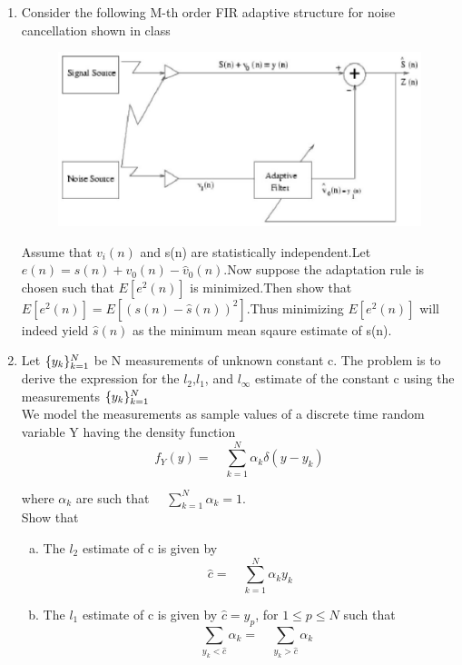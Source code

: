 \documentclass[journal,12pt,twocolumn]{IEEEtran}
\begin{document}
\begin{enumerate}
\item Consider the following M-th order FIR adaptive structure for noise cancellation shown in class
\begin{figure}
\centering
\includegraphics[width=\columnwidth]{./figs/figure1.eps}
\caption{}
\label{fig:hw1}
\end{figure}


Assume that $v_i(n)$ and s(n) are statistically independent.Let $e(n)=s(n)+v_0(n)-\hat{v}_0(n)$.Now suppose the adaptation rule is chosen such that $E[e^2(n)]$ is minimized.Then show that $E[e^2(n)]=E[(s(n)-\hat{s}(n))^2]$.Thus minimizing $E[e^2(n)]$ will indeed yield $\hat{s}(n)$ as the minimum mean sqaure estimate of s(n).

\item Let $\{\large{y}_k\}_{k=1}^N$ be N measurements of unknown constant c. The problem is to derive the expression for the $l_2$,$l_1$, and $l_\infty$ estimate of the constant c using the measurements $\{\large{y}_k\}_{k=1}^N$\\
We model the measurements as sample values of a discrete time random variable Y having the density function\\
                            $$f_Y(y)=\quad\sum_{k=1}^{N}{\alpha_k}{\delta(y-y_k)}$$
                             
where $\alpha_k$ are such that $\quad\sum_{k=1}^{N}{\alpha_k}=1.$\\
Show that
\begin{enumerate}[(a)]
\item The $l_2$ estimate of c is given by
$$\hat{c}=\quad\sum_{k=1}^{N}{\alpha_k}{y_k}$$
\item The $l_1$ estimate of c is given by $\hat{c}={y_p}$, for $1\leq{p}\leq{N}$ such that
$$\quad\sum_{y_k<{\hat{c}}}\alpha_{k}=\quad\sum_{y_k>{\hat{c}}}\alpha_{k}$$


\end{enumerate}
\end{enumerate}
\end{document}
